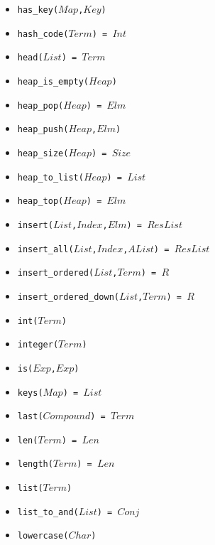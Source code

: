 \documentclass[10pt]{article}
\begin{document}
\begin{multicols}{2}
\begin{scriptsize}
\begin{itemize}
    \item \texttt{has\_key($Map$,$Key$)} 
    \item \texttt{hash\_code($Term$) = $Int$} 
    \item \texttt{head($List$) = $Term$} 
    \item \texttt{heap\_is\_empty($Heap$)}
    \item \texttt{heap\_pop($Heap$) = $Elm$}
    \item \texttt{heap\_push($Heap$,$Elm$)}
    \item \texttt{heap\_size($Heap$) = $Size$}
    \item \texttt{heap\_to\_list($Heap$) = $List$}
    \item \texttt{heap\_top($Heap$) = $Elm$}
    \item \texttt{insert($List$,$Index$,$Elm$) = $ResList$} 
    \item \texttt{insert\_all($List$,$Index$,$AList$) = $ResList$} 
    \item \texttt{insert\_ordered($List$,$Term$) = $R$} 
    \item \texttt{insert\_ordered\_down($List$,$Term$) = $R$} 
    \item \texttt{int($Term$)} 
    \item \texttt{integer($Term$)} 
    \item \texttt{is($Exp$,$Exp$)} 
    \item \texttt{keys($Map$) = $List$} 
    \item \texttt{last($Compound$) = $Term$} 
    \item \texttt{len($Term$) = $Len$} 
    \item \texttt{length($Term$) = $Len$} 
    \item \texttt{list($Term$)} 
    \item \texttt{list\_to\_and($List$) = $Conj$}
    \item \texttt{lowercase($Char$)} 

\end{itemize}
\end{scriptsize}
\end{multicols}
\end{document}
